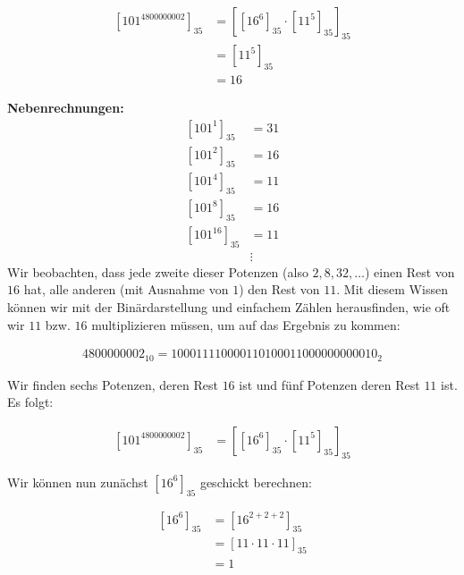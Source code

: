 \documentclass{../crypto}
\begin{document}
\subsection{}
\begin{align*}
  \left[101^{4800000002}\right]_{35} & = \left[ \left[16^6\right]_{35} \cdot \left[11^5\right]_{35} \right]_{35} \\
                                     & = \left[11^5\right]_{35}                                                  \\
                                     & = 16
\end{align*}

\textbf{Nebenrechnungen:}
\begin{align*}
  \left[101^{1}\right]_{35} &= 31  \\
  \left[101^{2}\right]_{35} &= 16  \\
  \left[101^{4}\right]_{35} &= 11  \\
  \left[101^{8}\right]_{35} &= 16  \\
  \left[101^{16}\right]_{35} &= 11 \\
                             &\vdots
\end{align*}
Wir beobachten, dass jede zweite dieser Potenzen (also $2, 8, 32, \dots$) einen
Rest von $16$ hat, alle anderen (mit Ausnahme von $1$) den Rest von $11$.
Mit diesem Wissen können wir mit der Binärdarstellung und einfachem Zählen
herausfinden, wie oft wir $11$ bzw. $16$ multiplizieren müssen, um auf das 
Ergebnis zu kommen:

\begin{align*}
   4800000002_{10} = 1 00 01 11 10 00 01 10 10 00 11 00 00 00 00 00 10_2
\end{align*}

Wir finden sechs Potenzen, deren Rest $16$ ist und fünf Potenzen deren Rest $11$ 
ist. Es folgt:

\begin{align*}
  \left[101^{4800000002}\right]_{35} &= \left[ \left[16^6\right]_{35} \cdot \left[11^5\right]_{35} \right]_{35}
\end{align*}

Wir können nun zunächst $\left[16^6\right]_{35}$ geschickt berechnen:

\begin{align*}
  \left[16^6\right]_{35}  & = \left[16^{2+2+2}\right]_{35}           \\
                          & = \left[11 \cdot 11 \cdot 11\right]_{35} \\
                          & = 1                                      \\
\end{align*}
\end{document}
